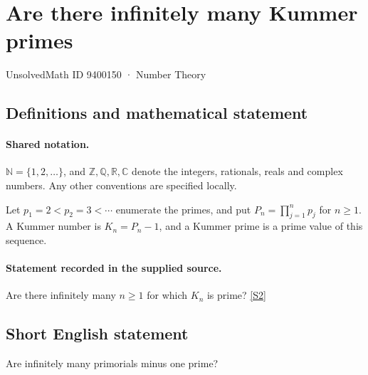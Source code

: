 \documentclass[11pt]{article}
\newcommand{\sref}[2]{\hyperlink{source:#1:#2}{[S#2]}}
\begin{document}
\setcounter{section}{9400149}
\section{Are there infinitely many Kummer primes}\label{9400150}
{\small\sffamily UnsolvedMath ID 9400150 · Number Theory}
\subsection{Definitions and mathematical statement}

\paragraph{Shared notation.}$\mathbb N=\{1,2,\ldots\}$, and $\mathbb Z,\mathbb Q,\mathbb R,\mathbb C$ denote the integers, rationals, reals and complex numbers. Any other conventions are specified locally.


Let $p_1=2<p_2=3<\cdots$ enumerate the primes, and put $P_n=\prod_{j=1}^n p_j$ for $n\ge1$. A Kummer number is $K_n=P_n-1$, and a Kummer prime is a prime value of this sequence.
\paragraph{Statement recorded in the supplied source.}
Are there infinitely many $n\ge1$ for which $K_n$ is prime? \sref{9400150}{2}
\subsection{Short English statement}
Are infinitely many primorials minus one prime?
\end{document}
